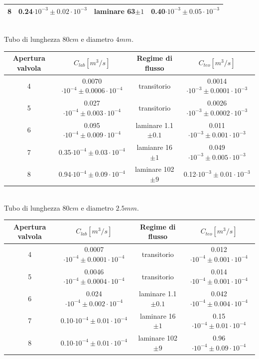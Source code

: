 \documentclass[a4paper,11pt]{article}
\begin{document}
\begin{center}
\begin{tabular}{|c|c|c|c|}
\hline 8 & 0.24$\cdot10^{-3}\pm 0.02\cdot10^{-3}$ & laminare 63$\pm1$ & 0.40$\cdot10^{-3}\pm 0.05\cdot10^{-3}$ \\ 
\hline 
\end{tabular}\\
\vspace{5pt}
Tubo di lunghezza $80cm$ e diametro $4mm$.
\\
\vspace{15pt}
\begin{tabular}{|c|c|c|c|}
\hline Apertura valvola & $C_{lab} [m^3/s]$ & Regime di flusso & $C_{teo} [m^3/s]$ \\ 
\hline 4 & 0.0070$\cdot10^{-4}\pm 0.0006\cdot10^{-4}$ & transitorio & 0.0014$\cdot10^{-3}\pm 0.0001\cdot10^{-3}$ \\ 
\hline 5 & 0.027$\cdot10^{-4}\pm 0.003\cdot10^{-4}$ & transitorio & 0.0026$\cdot10^{-3}\pm 0.0002\cdot10^{-3}$ \\ 
\hline 6 & 0.095$\cdot10^{-4}\pm 0.009\cdot10^{-4}$ & laminare 1.1$\pm0.1$ & 0.011$\cdot10^{-3}\pm 0.001\cdot10^{-3}$\\
\hline 7 & 0.35$\cdot10^{-4}\pm 0.03\cdot10^{-4}$ & lamianre 16$\pm1$ & 0.049$\cdot10^{-3}\pm 0.005\cdot10^{-3}$ \\
\hline 8 & 0.94$\cdot10^{-4}\pm 0.09\cdot10^{-4}$ & laminare 102$\pm9$ & 0.12$\cdot10^{-3}\pm 0.01\cdot10^{-3}$ \\ 
\hline 
\end{tabular}\\
\vspace{5pt}
Tubo di lunghezza $80cm$ e diametro $2.5mm$.
\\
\vspace{15pt}
\begin{tabular}{|c|c|c|c|}
\hline Apertura valvola & $C_{lab} [m^3/s]$ & Regime di flusso & $C_{teo} [m^3/s]$ \\ 
\hline 4 & 0.0007$\cdot10^{-4}\pm 0.0001\cdot10^{-4}$ & transitorio & 0.012$\cdot10^{-4}\pm 0.001\cdot10^{-4}$ \\ 
\hline 5 & 0.0046$\cdot10^{-4}\pm 0.0004\cdot10^{-4}$ & transitorio & 0.014$\cdot10^{-4}\pm 0.001\cdot10^{-4}$ \\ 
\hline 6 & 0.024$\cdot10^{-4}\pm 0.002\cdot10^{-4}$ & laminare 1.1$\pm0.1$ & 0.042$\cdot10^{-4}\pm 0.004\cdot10^{-4}$ \\
\hline 7 & 0.10$\cdot10^{-4}\pm 0.01\cdot10^{-4}$ & laminare 16$\pm1$ & 0.15$\cdot10^{-4}\pm 0.01\cdot10^{-4}$ \\
\hline 8 & 0.10$\cdot10^{-4}\pm 0.01\cdot10^{-4}$ & laminare 102$\pm9$ & 0.96$\cdot10^{-4}\pm 0.09\cdot10^{-4}$ \\ 

\end{tabular}
\end{center}
\end{document}
